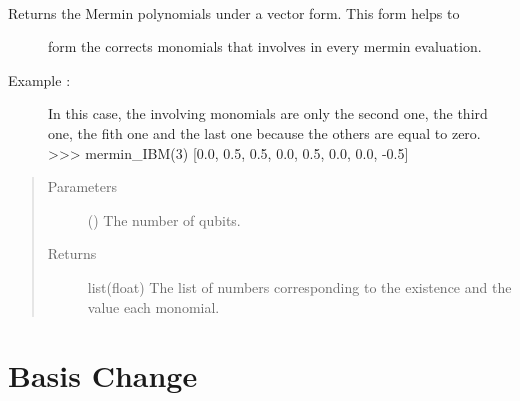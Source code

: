 \documentclass[letterpaper,10pt,english]{sphinxmanual}
\begin{document}
\begin{fulllineitems}
\label{\detokenize{evaluation:mermin_on_qiskit.evaluation.mermin_IBM}}~\begin{description}
\item[{Returns the Mermin polynomials under a vector form. This form helps to }] \leavevmode
form the corrects monomials that involves in every mermin evaluation.

\item[{Example :}] \leavevmode
In this case, the involving monomials are only the second one, the third 
one, the fith one and the last one because the others are equal to zero.
\textgreater{}\textgreater{}\textgreater{} mermin\_IBM(3)
{[}0.0, 0.5, 0.5, 0.0, 0.5, 0.0, 0.0, -0.5{]}

\end{description}
\begin{quote}\begin{description}
\item[{Parameters}] \leavevmode
{} () \textendash{} The number of qubits.

\item[{Returns}] \leavevmode
list(float) \textendash{} The list of numbers corresponding to the existence 
and the value each monomial.

\end{description}\end{quote}

\end{fulllineitems}



\chapter{Basis Change}
\label{\detokenize{basis_change:module-mermin_on_qiskit.basis_change}}\label{\detokenize{basis_change:basis-change}}\label{\detokenize{basis_change::doc}}
\end{document}
